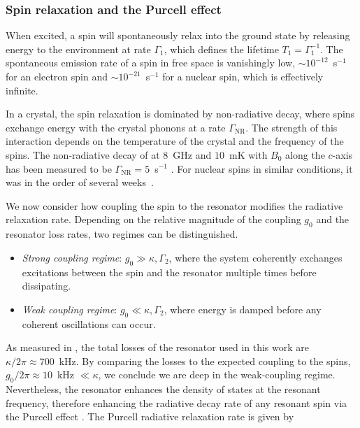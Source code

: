 \subsubsection{Spin relaxation and the Purcell effect}

When excited, a spin will spontaneously relax into the ground state by releasing energy to the environment at rate $\Gamma_1$, which defines the lifetime $T_1=\Gamma_1^{-1}$. The spontaneous emission rate of a spin in free space is vanishingly low, $\sim 10^{-12}$~s$^{-1}$ for an electron spin and $\sim 10^{-21}$~s$^{-1}$ for a nuclear spin, which is effectively infinite.

In a crystal, the spin relaxation is dominated by non-radiative decay, where spins exchange energy with the crystal phonons at a rate $\Gamma_\text{NR}$. The strength of this interaction depends on the temperature of the crystal and the frequency of the spins. The non-radiative decay of \Er at $8$~GHz and $10$~mK with $B_0$ along the $c$-axis has been measured to be $\Gamma_\text{NR} = 5$~s$^{-1}$ . For \W nuclear spins in similar conditions, it was in the order of several weeks~.

We now consider how coupling the \Er spin to the resonator modifies the radiative relaxation rate. Depending on the relative magnitude of the coupling $g_0$ and the resonator loss rates, two regimes can be distinguished.

\begin{itemize}
    \item \textit{Strong coupling regime}: $g_0 \gg \kappa, \Gamma_2$, where the system coherently exchanges excitations between the spin and the resonator multiple times before dissipating.
    \item \textit{Weak coupling regime}: $g_0 \ll \kappa, \Gamma_2$, where energy is damped before any coherent oscillations can occur.
\end{itemize}

As measured in , the total losses of the resonator used in this work are $\kappa/2\pi \approx 700$~kHz. By comparing the losses to the expected coupling to the spins, $g_0/2\pi \approx 10$~kHz $\ll \kappa$, we conclude we are deep in the weak-coupling regime. Nevertheless, the resonator enhances the density of states at the resonant frequency, therefore enhancing the radiative decay rate of any resonant \Er spin via the Purcell effect . The Purcell radiative relaxation rate is given by

